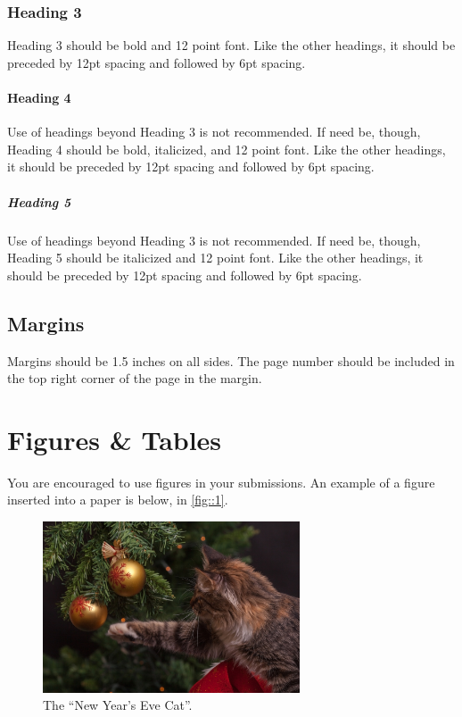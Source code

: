 {{{{\subsubsection*{Heading 3}
Heading 3 should be bold and 12 point font. Like the other headings, it should
be preceded by 12pt spacing and followed by 6pt spacing.

\paragraph*{Heading 4}
Use of headings beyond Heading 3 is not recommended. If need be, though, Heading
4 should be bold, italicized, and 12 point font. Like the other headings, it
should be preceded by 12pt spacing and followed by 6pt spacing.

\subparagraph*{Heading 5}
Use of headings beyond Heading 3 is not recommended. If need be, though, Heading
5 should be italicized and 12 point font. Like the other headings, it should be
preceded by 12pt spacing and followed by 6pt spacing.


\subsection*{Margins}
Margins should be 1.5 inches on all sides. The page number should be included in
the top right corner of the page in the margin.


\section*{Figures \& Tables}
You are encouraged to use figures in your submissions. An example of a figure
inserted into a paper is below, in \autoref{fig::1}.

\begin{figure}[H]
  \centering
  \includegraphics[width=3in, scale=.5]{figs/example-image}
  \caption{The ``New Year's Eve Cat''.}
  \label{fig::1}
\end{figure}

}}}}
